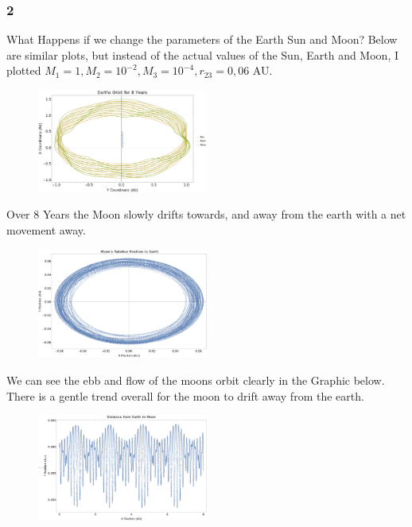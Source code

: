 \documentclass{article}
\begin{document}
\subsubsection{2}

What Happens if we change the parameters of the Earth Sun and Moon?
Below are similar plots, but instead of the actual values of the Sun, Earth and Moon, I plotted $M_1 = 1, M_2 = 10^{-2}, M_3 = 10^{-4}, r_{23} = 0,06$ AU. 

\begin{figure}[!htb]
	\begin{center}
		\includegraphics[width=0.5\textwidth]{p1-2a.pdf}
	\end{center}
	\caption{}
\label{fig:qual}
\end{figure}
\FloatBarrier

Over 8 Years the Moon slowly drifts towards, and away from the earth with a net movement away.

\begin{figure}[!htb]
	\begin{center}
		\includegraphics[width=0.5\textwidth]{p1-2b.pdf}
	\end{center}
	\caption{}
\label{fig:qual}
\end{figure}
\FloatBarrier

We can see the ebb and flow of the moons orbit clearly in the Graphic below. There is a gentle trend overall for the moon to drift away from the earth.

\begin{figure}[!htb]
	\begin{center}
		\includegraphics[width=0.5\textwidth]{p1-2c.pdf}
	\end{center}
	\caption{}
\label{fig:qual}
\end{figure}
\FloatBarrier
\end{document}
